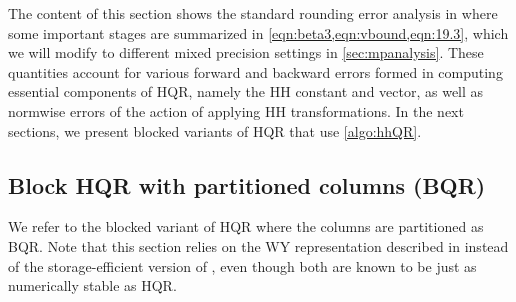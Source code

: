 \documentclass[review,onefignum,onetabnum]{siamart190516}
\newcommand{\bb}[1]{\mathbf{#1}}
\begin{document}
The content of this section shows the standard rounding error analysis in \cite{Higham2002} where some important stages are summarized in \cref{eqn:beta3,eqn:vbound,eqn:19.3}, which we will modify to different mixed precision settings in \cref{sec:mpanalysis}.
These quantities account for various forward and backward errors formed in computing essential components of HQR, namely the HH constant and vector, as well as normwise errors of the action of applying HH transformations.
In the next sections, we present blocked variants of HQR that use \cref{algo:hhQR}.

%
\subsection{Block HQR with partitioned columns (BQR)}\label{sec:BQR}
We refer to the blocked variant of HQR where the columns are partitioned as BQR. 
Note that this section relies on the WY representation described in \cite{Bischof1987} instead of the storage-efficient version of \cite{Schreiber1989}, even though both are known to be just as numerically stable as HQR.
\end{document}

